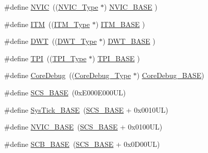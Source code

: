 \begin{DoxyCompactItemize}
\item 
\#define \hyperlink{group___c_m_s_i_s__core__base_gac8e97e8ce56ae9f57da1363a937f8a17}{N\-V\-I\-C}~((\hyperlink{struct_n_v_i_c___type}{N\-V\-I\-C\-\_\-\-Type}      $\ast$)     \hyperlink{group___c_m_s_i_s__core__base_gaa0288691785a5f868238e0468b39523d}{N\-V\-I\-C\-\_\-\-B\-A\-S\-E}     )
\item 
\#define \hyperlink{group___c_m_s_i_s__core__base_gabae7cdf882def602cb787bb039ff6a43}{I\-T\-M}~((\hyperlink{struct_i_t_m___type}{I\-T\-M\-\_\-\-Type}       $\ast$)     \hyperlink{group___c_m_s_i_s__core__base_gadd76251e412a195ec0a8f47227a8359e}{I\-T\-M\-\_\-\-B\-A\-S\-E}      )
\item 
\#define \hyperlink{group___c_m_s_i_s__core__base_gabbe5a060185e1d5afa3f85b14e10a6ce}{D\-W\-T}~((\hyperlink{struct_d_w_t___type}{D\-W\-T\-\_\-\-Type}       $\ast$)     \hyperlink{group___c_m_s_i_s__core__base_gafdab534f961bf8935eb456cb7700dcd2}{D\-W\-T\-\_\-\-B\-A\-S\-E}      )
\item 
\#define \hyperlink{group___c_m_s_i_s__core__base_ga8b4dd00016aed25a0ea54e9a9acd1239}{T\-P\-I}~((\hyperlink{struct_t_p_i___type}{T\-P\-I\-\_\-\-Type}       $\ast$)     \hyperlink{group___c_m_s_i_s__core__base_ga2b1eeff850a7e418844ca847145a1a68}{T\-P\-I\-\_\-\-B\-A\-S\-E}      )
\item 
\#define \hyperlink{group___c_m_s_i_s__core__base_gab6e30a2b802d9021619dbb0be7f5d63d}{Core\-Debug}~((\hyperlink{struct_core_debug___type}{Core\-Debug\-\_\-\-Type} $\ast$)     \hyperlink{group___c_m_s_i_s__core__base_ga680604dbcda9e9b31a1639fcffe5230b}{Core\-Debug\-\_\-\-B\-A\-S\-E})
\item 
\#define \hyperlink{group___c_m_s_i_s__core__base_ga3c14ed93192c8d9143322bbf77ebf770}{S\-C\-S\-\_\-\-B\-A\-S\-E}~(0x\-E000\-E000\-U\-L)
\item 
\#define \hyperlink{group___c_m_s_i_s__core__base_ga58effaac0b93006b756d33209e814646}{Sys\-Tick\-\_\-\-B\-A\-S\-E}~(\hyperlink{group___c_m_s_i_s__core__base_ga3c14ed93192c8d9143322bbf77ebf770}{S\-C\-S\-\_\-\-B\-A\-S\-E} +  0x0010\-U\-L)
\item 
\#define \hyperlink{group___c_m_s_i_s__core__base_gaa0288691785a5f868238e0468b39523d}{N\-V\-I\-C\-\_\-\-B\-A\-S\-E}~(\hyperlink{group___c_m_s_i_s__core__base_ga3c14ed93192c8d9143322bbf77ebf770}{S\-C\-S\-\_\-\-B\-A\-S\-E} +  0x0100\-U\-L)
\item 
\#define \hyperlink{group___c_m_s_i_s__core__base_gad55a7ddb8d4b2398b0c1cfec76c0d9fd}{S\-C\-B\-\_\-\-B\-A\-S\-E}~(\hyperlink{group___c_m_s_i_s__core__base_ga3c14ed93192c8d9143322bbf77ebf770}{S\-C\-S\-\_\-\-B\-A\-S\-E} +  0x0\-D00\-U\-L)

\end{DoxyCompactItemize}
